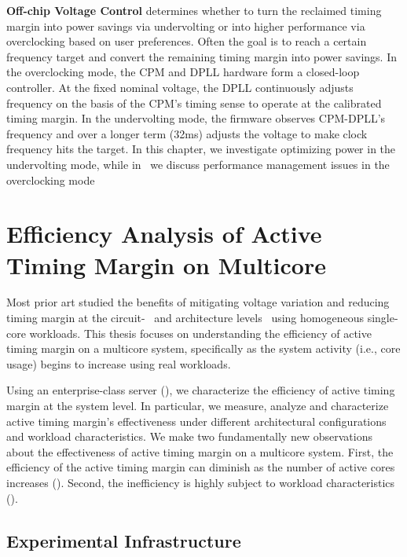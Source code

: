 \textbf{Off-chip Voltage Control} determines whether to turn the reclaimed timing margin into power savings via undervolting or into higher performance via overclocking based on user preferences. Often the goal is to reach a certain frequency target and convert the remaining timing margin into power savings. In the overclocking mode, the CPM and DPLL hardware form a closed-loop controller. At the fixed nominal voltage, the DPLL continuously adjusts frequency on the basis of the CPM's timing sense to operate at the calibrated timing margin. In the undervolting mode, the firmware observes CPM-DPLL's frequency and over a longer term (32ms) adjusts the voltage to make clock frequency hits the target. In this chapter, we investigate optimizing power in the undervolting mode, while in~ we discuss performance management issues in the overclocking mode

\section{Efficiency Analysis of Active Timing Margin on Multicore}
\label{sec:voltage:characterization}

Most prior art studied the benefits of mitigating voltage variation and reducing timing margin at the circuit-~\cite{kurd2008next,bowman201222nm,grenat20145,tokunaga20145,bowman20158} and architecture levels~\cite{lefurgy2011active,reddi2009voltage,gupta2008decor,powell2003pipeline,reddi2010voltage,bertran2014voltage} using homogeneous single-core workloads. This thesis focuses on understanding the efficiency of active timing margin on a multicore system, specifically as the system activity (i.e., core usage) begins to increase using real workloads.

Using an enterprise-class server (), we characterize the efficiency of active timing margin at the system level. In particular, we measure, analyze and characterize active timing margin's effectiveness under different architectural configurations and workload characteristics. We make two fundamentally new observations about the effectiveness of active timing margin on a multicore system. First, the efficiency of the active timing margin can diminish as the number of active cores increases (). Second, the inefficiency is highly subject to workload characteristics ().

\subsection{Experimental Infrastructure}
\label{sec:voltage:characterization:setup}
 
